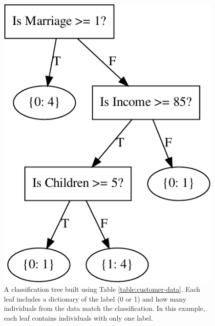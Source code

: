 \begin{figure}[H]
\centering
\includegraphics[scale=.8]{example_tree.pdf}
\caption{A classification tree built using Table \ref{table:customer-data}.
Each leaf includes a dictionary of the label (0 or 1) and how many individuals from the data match the classification.
In this example, each leaf contains individuals with only one label.}
\label{figure:simple-tree}
\end{figure}

